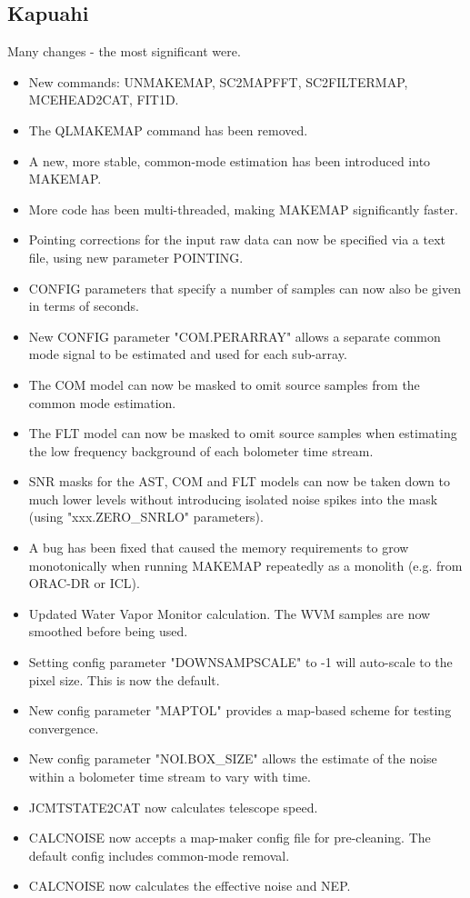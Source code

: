 \documentclass[oneside,11pt]{starlink}
\begin{document}
\subsection{Kapuahi}
Many changes - the most significant were.
\begin{itemize}
\item New commands: UNMAKEMAP, SC2MAPFFT, SC2FILTERMAP, MCEHEAD2CAT, FIT1D.
\item The QLMAKEMAP command has been removed.
\item A new, more stable, common-mode estimation has been introduced into MAKEMAP.
\item More code has been multi-threaded, making MAKEMAP significantly faster.
\item Pointing corrections for the input raw data can now be specified via a
text file, using new parameter POINTING.
\item CONFIG parameters that specify a number of samples can now also be given
in terms of seconds.
\item New CONFIG parameter "COM.PERARRAY" allows a separate common mode signal
to be estimated and used for each sub-array.
\item The COM model can now be masked to omit source samples from the common
mode estimation.
\item The FLT model can now be masked to omit source samples when estimating
the low frequency background of each bolometer time stream.
\item SNR masks for the AST, COM and FLT models can now be taken down to much
lower levels without introducing isolated noise spikes into the mask
(using "xxx.ZERO\_SNRLO" parameters).
\item A bug has been fixed that caused the memory requirements to grow
monotonically when running MAKEMAP repeatedly as a monolith (e.g. from
ORAC-DR or ICL).
\item Updated Water Vapor Monitor calculation. The WVM samples are now smoothed
before being used.
\item Setting config parameter "DOWNSAMPSCALE" to -1 will auto-scale to the pixel
size. This is now the default.
\item New config parameter "MAPTOL" provides a map-based scheme for
testing convergence.
\item New config parameter "NOI.BOX\_SIZE" allows the estimate of the noise
within a bolometer time stream to vary with time.
\item JCMTSTATE2CAT now calculates telescope speed.
\item CALCNOISE  now accepts a map-maker config file for pre-cleaning.
The default config includes common-mode removal.
\item CALCNOISE now calculates the effective noise and NEP.
\end{itemize}
\end{document}
